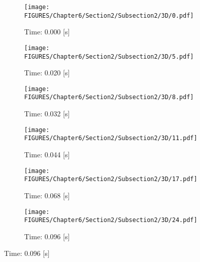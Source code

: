 \begin{figure}[ht]
    \centering
    \begin{subfigure}{0.32\textwidth}
        \centering
        \texttt{[image: FIGURES/Chapter6/Section2/Subsection2/3D/0.pdf]}
        \caption{Time: 0.000 [s]}
        \label{fig:figura1}
    \end{subfigure}
    \hfill
    \begin{subfigure}{0.32\textwidth}
        \centering
        \texttt{[image: FIGURES/Chapter6/Section2/Subsection2/3D/5.pdf]}
        \caption{Time: 0.020 [s]}
        \label{fig:figura2}
    \end{subfigure}
    \hfill
    \begin{subfigure}{0.32\textwidth}
        \centering
        \texttt{[image: FIGURES/Chapter6/Section2/Subsection2/3D/8.pdf]}
        \caption{Time: 0.032 [s]}
        \label{fig:figura3}
    \end{subfigure}

    \vspace{0.3cm}

    \begin{subfigure}{0.32\textwidth}
        \centering
        \texttt{[image: FIGURES/Chapter6/Section2/Subsection2/3D/11.pdf]}
        \caption{Time: 0.044 [s]}
        \label{fig:figura4}
    \end{subfigure}
    \hfill
    \begin{subfigure}{0.32\textwidth}
        \centering
        \texttt{[image: FIGURES/Chapter6/Section2/Subsection2/3D/17.pdf]}
        \caption{Time: 0.068 [s]}
        \label{fig:figura5}
    \end{subfigure}
    \hfill
    \begin{subfigure}{0.32\textwidth}
        \centering
        \texttt{[image: FIGURES/Chapter6/Section2/Subsection2/3D/24.pdf]}
        \caption{Time: 0.096 [s]}
        \label{fig:figura6}
    \end{subfigure}

    \vspace{0.3cm}


\end{figure}
